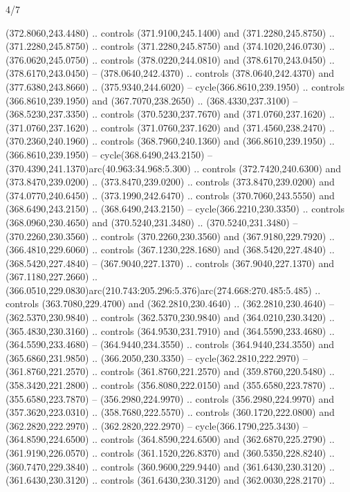 \begin{flagdescription}{4/7}
\begin{scope}[shift={(0.5\flaglength,0.5\flagwidth)},scale=\flagwidth*\stretchfactor/820]
\begin{scope}[scale=1.87,xshift=-138mm,yshift=75mm]
\begin{scope}[y=0.8pt, x=0.8pt, yscale=-1, xscale=1]
\begin{scope}[cm={{1.16833,0.0,0.0,1.16833,(-0.699,1.184)}},fill=c78732e]
  (372.8060,243.4480) .. controls (371.9100,245.1400) and (371.2280,245.8750) ..
  (371.2280,245.8750) .. controls (371.2280,245.8750) and (374.1020,246.0730) ..
  (376.0620,245.0750) .. controls (378.0220,244.0810) and (378.6170,243.0450) ..
  (378.6170,243.0450) -- (378.0640,242.4370) .. controls (378.0640,242.4370) and
  (377.6380,243.8660) .. (375.9340,244.6020) -- cycle(366.8610,239.1950) ..
  controls (366.8610,239.1950) and (367.7070,238.2650) .. (368.4330,237.3100) --
  (368.5230,237.3350) .. controls (370.5230,237.7670) and (371.0760,237.1620) ..
  (371.0760,237.1620) .. controls (371.0760,237.1620) and (371.4560,238.2470) ..
  (370.2360,240.1960) .. controls (368.7960,240.1360) and (366.8610,239.1950) ..
  (366.8610,239.1950) -- cycle(368.6490,243.2150) --
  (370.4390,241.1370)arc(40.963:34.968:5.300) .. controls (372.7420,240.6300)
  and (373.8470,239.0200) .. (373.8470,239.0200) .. controls (373.8470,239.0200)
  and (374.0770,240.6450) .. (373.1990,242.6470) .. controls (370.7060,243.5550)
  and (368.6490,243.2150) .. (368.6490,243.2150) -- cycle(366.2210,230.3350) ..
  controls (368.0960,230.4650) and (370.5240,231.3480) .. (370.5240,231.3480) --
  (370.2260,230.3560) .. controls (370.2260,230.3560) and (367.9180,229.7920) ..
  (366.4810,229.6060) .. controls (367.1230,228.1680) and (368.5420,227.4840) ..
  (368.5420,227.4840) -- (367.9040,227.1370) .. controls (367.9040,227.1370) and
  (367.1180,227.2660) ..
  (366.0510,229.0830)arc(210.743:205.296:5.376)arc(274.668:270.485:5.485) ..
  controls (363.7080,229.4700) and (362.2810,230.4640) .. (362.2810,230.4640) --
  (362.5370,230.9840) .. controls (362.5370,230.9840) and (364.0210,230.3420) ..
  (365.4830,230.3160) .. controls (364.9530,231.7910) and (364.5590,233.4680) ..
  (364.5590,233.4680) -- (364.9440,234.3550) .. controls (364.9440,234.3550) and
  (365.6860,231.9850) .. (366.2050,230.3350) -- cycle(362.2810,222.2970) --
  (361.8760,221.2570) .. controls (361.8760,221.2570) and (359.8760,220.5480) ..
  (358.3420,221.2800) .. controls (356.8080,222.0150) and (355.6580,223.7870) ..
  (355.6580,223.7870) -- (356.2980,224.9970) .. controls (356.2980,224.9970) and
  (357.3620,223.0310) .. (358.7680,222.5570) .. controls (360.1720,222.0800) and
  (362.2820,222.2970) .. (362.2820,222.2970) -- cycle(366.1790,225.3430) --
  (364.8590,224.6500) .. controls (364.8590,224.6500) and (362.6870,225.2790) ..
  (361.9190,226.0570) .. controls (361.1520,226.8370) and (360.5350,228.8240) ..
  (360.7470,229.3840) .. controls (360.9600,229.9440) and (361.6430,230.3120) ..
  (361.6430,230.3120) .. controls (361.6430,230.3120) and (362.0030,228.2170) ..

\end{scope}
\end{scope}
\end{scope}
\end{scope}
\end{flagdescription}
